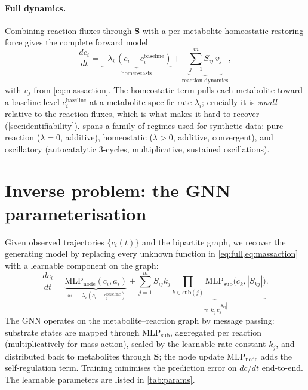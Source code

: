 \documentclass[11pt]{article}
\newcommand{\mlpsub}{\mathrm{MLP}_{\mathrm{sub}}}
\newcommand{\mlpnode}{\mathrm{MLP}_{\mathrm{node}}}
\begin{document}
\paragraph{Full dynamics.}
Combining reaction fluxes through $\mathbf{S}$ with a per-metabolite
homeostatic restoring force gives the complete forward model
\begin{equation}
\frac{dc_i}{dt}
  = \underbrace{-\lambda_i\,(c_i - c_i^{\mathrm{baseline}})}_{\text{homeostasis}}
  + \underbrace{\sum_{j=1}^{m} S_{ij}\, v_j}_{\text{reaction dynamics}},
\label{eq:full}
\end{equation}
with $v_j$ from \cref{eq:massaction}. The homeostatic term pulls each
metabolite toward a baseline level $c_i^{\mathrm{baseline}}$ at a
metabolite-specific rate $\lambda_i$; crucially it is \emph{small} relative
to the reaction fluxes, which is what makes it hard to recover
(\cref{sec:identifiability}).  spans a family of regimes used
for synthetic data: pure reaction ($\lambda = 0$, additive), homeostatic
($\lambda > 0$, additive, convergent), and oscillatory (autocatalytic
3-cycles, multiplicative, sustained oscillations).

\section{Inverse problem: the GNN parameterisation}
\label{sec:inverse}

Given observed trajectories $\{c_i(t)\}$ and the bipartite graph, we
recover the generating model by replacing every unknown function in
\cref{eq:full,eq:massaction} with a learnable component on the graph:
\begin{equation}
\frac{dc_i}{dt}
  = \underbrace{\mlpnode(c_i, a_i)}_{\approx\,-\lambda_i(c_i - c_i^{\mathrm{baseline}})}
  + \sum_{j=1}^{m} S_{ij}
    \underbrace{k_j \prod_{k \in \mathrm{sub}(j)} \mlpsub\!\big(c_k, |S_{kj}|\big)}
              _{\approx\,k_j\,c_k^{|S_{kj}|}}.
\label{eq:gnn}
\end{equation}
The GNN operates on the metabolite--reaction graph by message passing:
substrate states are mapped through $\mlpsub$, aggregated per reaction
(multiplicatively for mass-action), scaled by the learnable rate constant
$k_j$, and distributed back to metabolites through $\mathbf{S}$; the
node update $\mlpnode$ adds the self-regulation term. Training minimises the
prediction error on $dc/dt$ end-to-end. The learnable parameters are
listed in \cref{tab:params}.
\end{document}
